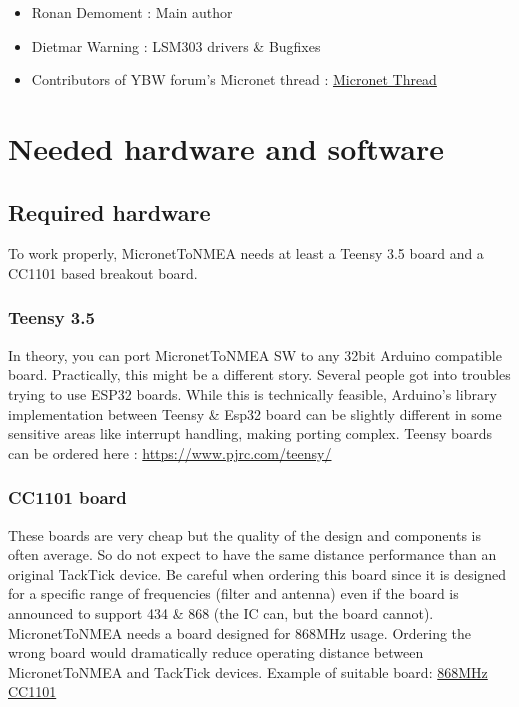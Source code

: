 \documentclass{report}
\begin{document}
\begin{itemize}
\item  Ronan Demoment : Main author
\item Dietmar Warning : LSM303 drivers \& Bugfixes
\item Contributors of YBW forum's Micronet thread : \href{https://forums.ybw.com/index.php?threads/raymarines-micronet.539500/}{Micronet Thread}
\end{itemize}

\chapter{Needed hardware and software}

\section{Required hardware}

To work properly, MicronetToNMEA needs at least a Teensy 3.5 board and a CC1101 based breakout board.

\subsection{Teensy 3.5}
In theory, you can port MicronetToNMEA SW to any 32bit Arduino compatible board. Practically, this might be a different story. Several people got into troubles trying to use ESP32 boards. While this is technically feasible, Arduino's library implementation between Teensy \& Esp32 board can be slightly different in some sensitive areas like interrupt handling, making porting complex.
Teensy boards can be ordered here : \url{https://www.pjrc.com/teensy/}

\subsection{CC1101 board}

These boards are very cheap but the quality of the design and components is often average. So do not expect to have the same distance performance than an original TackTick device. Be careful when ordering this board since it is designed for a specific range of frequencies (filter and antenna) even if the board is announced to support 434 \& 868 (the IC can, but the board cannot). MicronetToNMEA needs a board designed for 868MHz usage. Ordering the wrong board would dramatically reduce operating distance between MicronetToNMEA and TackTick devices. Example of suitable board:
\href{https://www.amazon.fr/laqiya-cc1101-868-MHz-Transmission-Antenne-Transceiver/dp/B075PFQ57G}{868MHz CC1101}
\end{document}
